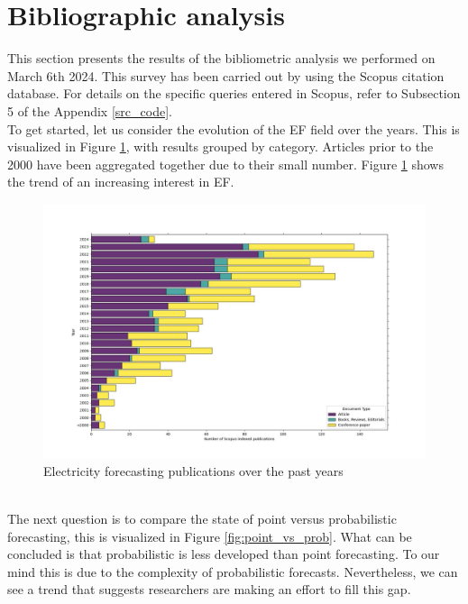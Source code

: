 \section{Bibliographic analysis}
This section presents the results of the bibliometric analysis we performed on March 6th 2024. This survey has been carried out by using the Scopus citation database. For details on the specific queries entered in Scopus, refer to Subsection 5 of the Appendix \ref{src_code}.
\\
To get started, let us consider the evolution of the EF field over the years. This is visualized in Figure \ref{fig:epf_evolution}, with results grouped by category. Articles prior to the 2000 have been aggregated together due to their small number. Figure \ref{fig:epf_evolution} shows the trend of an increasing interest in EF.
\begin{figure}
    \includegraphics[width=\textwidth]{images/epf_evolution1.jpg}
    \caption{Electricity forecasting publications over the past years}
    \label{fig:epf_evolution}
  \end{figure}
\\
The next question is to compare the state of point versus probabilistic forecasting, this is visualized in Figure \ref{fig:point_vs_prob}. What can be concluded is that probabilistic is less developed than point forecasting. To our mind this is due to the complexity of probabilistic forecasts.
Nevertheless, we can see a trend that suggests researchers are making an effort to fill this gap.
